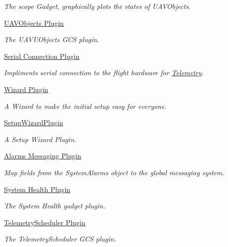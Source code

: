 \begin{DoxyCompactItemize}
\begin{DoxyCompactList}\small\item\em \-The scope \-Gadget, graphically plots the states of \-U\-A\-V\-Objects. \end{DoxyCompactList}\item 
\hyperlink{group___u_a_v_objects_plugin}{\-U\-A\-V\-Objects Plugin}
\begin{DoxyCompactList}\small\item\em \-The \-U\-A\-V\-U\-Objects \-G\-C\-S plugin. \end{DoxyCompactList}\item 
\hyperlink{group___serial_plugin}{\-Serial Connection Plugin}
\begin{DoxyCompactList}\small\item\em \-Impliments serial connection to the flight hardware for \hyperlink{class_telemetry}{\-Telemetry}. \end{DoxyCompactList}\item 
\hyperlink{group___setup}{\-Wizard  Plugin}
\begin{DoxyCompactList}\small\item\em \-A \-Wizard to make the initial setup easy for everyone. \end{DoxyCompactList}\item 
\hyperlink{group___setup_wizard_plugin}{\-Setup\-Wizard\-Plugin}
\begin{DoxyCompactList}\small\item\em \-A \-Setup \-Wizard \-Plugin. \end{DoxyCompactList}\item 
\hyperlink{group___system}{\-Alarms Messaging Plugin}
\begin{DoxyCompactList}\small\item\em \-Map fields from the \-System\-Alarms object to the global messaging system. \end{DoxyCompactList}\item 
\hyperlink{group___system_health_plugin}{\-System Health Plugin}
\begin{DoxyCompactList}\small\item\em \-The \-System \-Health gadget plugin. \end{DoxyCompactList}\item 
\hyperlink{group___telemetry_scheduler_plugin}{\-Telemetry\-Scheduler Plugin}
\begin{DoxyCompactList}\small\item\em \-The \-Telemetry\-Scheduler \-G\-C\-S plugin. \end{DoxyCompactList}\item 

\end{DoxyCompactItemize}
